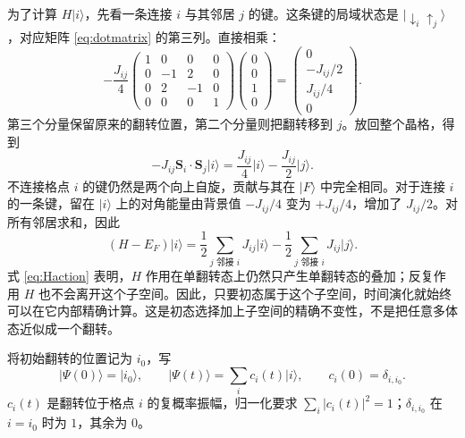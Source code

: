 \documentclass[UTF8,11pt,a4paper,fontset=fandol]{ctexart}
\newcommand{\ket}[1]{\lvert #1\rangle}
\begin{document}
为了计算 $H\ket{i}$，先看一条连接 $i$ 与其邻居 $j$ 的键。这条键的局域状态是 $\ket{\downarrow_i\uparrow_j}$，对应矩阵 \eqref{eq:dotmatrix} 的第三列。直接相乘：
\begin{equation}
-\frac{J_{ij}}4
\begin{pmatrix}
1&0&0&0\\
0&-1&2&0\\
0&2&-1&0\\
0&0&0&1
\end{pmatrix}
\begin{pmatrix}0\\0\\1\\0\end{pmatrix}
=
\begin{pmatrix}0\\-J_{ij}/2\\J_{ij}/4\\0\end{pmatrix}.
\end{equation}
第三个分量保留原来的翻转位置，第二个分量则把翻转移到 $j$。放回整个晶格，得到
\begin{equation}
-J_{ij}\mathbf S_i\cdot\mathbf S_j\ket{i}
=\frac{J_{ij}}4\ket{i}-\frac{J_{ij}}2\ket{j}.
\label{eq:bondaction}
\end{equation}
不连接格点 $i$ 的键仍然是两个向上自旋，贡献与其在 $\ket{F}$ 中完全相同。对于连接 $i$ 的一条键，留在 $\ket{i}$ 上的对角能量由背景值 $-J_{ij}/4$ 变为 $+J_{ij}/4$，增加了 $J_{ij}/2$。对所有邻居求和，因此
\begin{equation}
\boxed{
(H-E_F)\ket{i}
=\frac12\sum_{j\text{ 邻接 }i}J_{ij}\ket{i}
-\frac12\sum_{j\text{ 邻接 }i}J_{ij}\ket{j}.
}
\label{eq:Haction}
\end{equation}
式 \eqref{eq:Haction} 表明，$H$ 作用在单翻转态上仍然只产生单翻转态的叠加；反复作用 $H$ 也不会离开这个子空间。因此，只要初态属于这个子空间，时间演化就始终可以在它内部精确计算。这是初态选择加上子空间的精确不变性，不是把任意多体态近似成一个翻转。

将初始翻转的位置记为 $i_0$，写
\begin{equation}
\ket{\Psi(0)}=\ket{i_0},\qquad
\ket{\Psi(t)}=\sum_i c_i(t)\ket{i},
\qquad
c_i(0)=\delta_{i,i_0}.
\end{equation}
$c_i(t)$ 是翻转位于格点 $i$ 的复概率振幅，归一化要求
$\sum_i|c_i(t)|^2=1$；$\delta_{i,i_0}$ 在 $i=i_0$ 时为 $1$，其余为 $0$。
\end{document}

